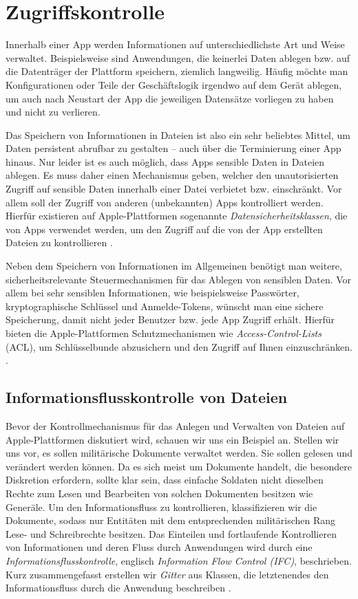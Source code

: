 \section{Zugriffskontrolle}
Innerhalb einer App werden Informationen auf unterschiedlichste Art und Weise
verwaltet. Beispielsweise sind Anwendungen, die keinerlei Daten ablegen bzw. auf
die Datenträger der Plattform speichern, ziemlich langweilig. Häufig möchte man
Konfigurationen oder Teile der Geschäftslogik irgendwo auf dem Gerät ablegen, um
auch nach Neustart der App die jeweiligen Datensätze vorliegen zu haben und
nicht zu verlieren.

Das Speichern von Informationen in Dateien ist also ein sehr beliebtes Mittel,
um Daten persistent abrufbar zu gestalten -- auch über die Terminierung einer
App hinaus. Nur leider ist es auch möglich, dass Apps sensible Daten in Dateien
ablegen.  Es muss daher einen Mechanismus geben, welcher den unautorisierten
Zugriff auf sensible Daten innerhalb einer Datei verbietet bzw.  einschränkt.
Vor allem soll der Zugriff von anderen (unbekannten) Apps kontrolliert werden.
Hierfür existieren auf Apple-Plattformen sogenannte
\textit{Datensicherheitsklassen}, die von Apps verwendet werden, um den Zugriff
auf die von der App erstellten Dateien zu kontrollieren \cite[S. 50]{apple2020}.

Neben dem Speichern von Informationen im Allgemeinen benötigt man weitere,
sicherheitsrelevante Steuermechanismen für das Ablegen von sensiblen Daten. Vor
allem bei sehr sensiblen Informationen, wie beispielsweise Pass\-wör\-ter,
kryptographische Schlüssel und Anmelde-Tokens, wünscht man eine sichere
Speicherung, damit nicht jeder Benutzer bzw. jede App Zugriff erhält. Hierfür
bieten die Apple-Plattformen Schutzmechanismen wie \textit{Access-Control-Lists}
(ACL), um Schlüsselbunde abzusichern und den Zugriff auf Ihnen einzuschränken.
\cite[S. 55]{apple2020}.

\subsection{Informationsflusskontrolle von Dateien}
Bevor der Kontrollmechanismus für das Anlegen und Verwalten von Dateien auf
Apple-Plattformen diskutiert wird, schauen wir uns ein Beispiel an. Stellen wir
uns vor, es sollen militärische Dokumente verwaltet werden. Sie sollen gelesen
und verändert werden können. Da es sich meist um Dokumente handelt, die
besondere Diskretion erfordern, sollte klar sein, dass einfache Soldaten nicht
dieselben Rechte zum Lesen und Bearbeiten von solchen Dokumenten besitzen wie
Generäle. Um den Informationsfluss zu kontrollieren, klassifizieren wir die
Dokumente, sodass nur Entitäten mit dem entsprechenden militärischen Rang Lese-
und Schreibrechte besitzen. Das Einteilen und fortlaufende Kontrollieren von
Informationen und deren Fluss durch Anwendungen wird durch eine
\textit{Informationsflusskontrolle}, englisch \textit{Information Flow Control
(IFC)}, beschrieben. Kurz zusammengefasst erstellen wir \textit{Gitter} aus
Klassen, die letztenendes den Informationsfluss durch die Anwendung beschreiben
\cite{ifc}.

